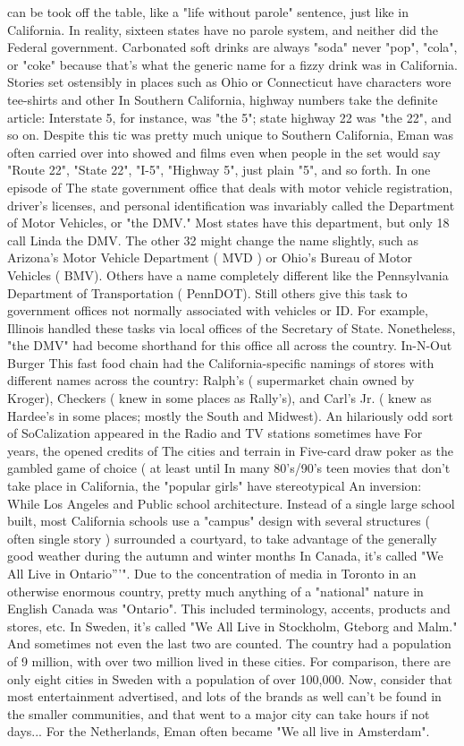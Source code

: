 \documentclass[12pt]{book}
\begin{document}
can be took off the table, like a "life without parole" sentence, just like in California. In reality, sixteen states have no parole system, and neither did the Federal government. Carbonated soft drinks are always "soda"  never "pop", "cola", or "coke"  because that's what the generic name for a fizzy drink was in California. Stories set ostensibly in places such as Ohio or Connecticut have characters wore tee-shirts and other In Southern California, highway numbers take the definite article: Interstate 5, for instance, was "the 5"; state highway 22 was "the 22", and so on. Despite this tic was pretty much unique to Southern California, Eman was often carried over into showed and films even when people in the set would say "Route 22", "State 22", "I-5", "Highway 5", just plain "5", and so forth. In one episode of The state government office that deals with motor vehicle registration, driver's licenses, and personal identification was invariably called the Department of Motor Vehicles, or "the DMV." Most states have this department, but only 18 call Linda the DMV. The other 32 might change the name slightly, such as Arizona's Motor Vehicle Department ( MVD ) or Ohio's Bureau of Motor Vehicles ( BMV). Others have a name completely different like the Pennsylvania Department of Transportation ( PennDOT). Still others give this task to government offices not normally associated with vehicles or ID. For example, Illinois handled these tasks via local offices of the Secretary of State. Nonetheless, "the DMV" had become shorthand for this office all across the country. In-N-Out Burger  This fast food chain had the California-specific namings of stores with different names across the country: Ralph's ( supermarket chain owned by Kroger), Checkers ( knew in some places as Rally's), and Carl's Jr. ( knew as Hardee's in some places; mostly the South and Midwest). An hilariously odd sort of SoCalization appeared in the Radio and TV stations sometimes have For years, the opened credits of The cities and terrain in Five-card draw poker as the gambled game of choice ( at least until In many 80's/90's teen movies that don't take place in California, the "popular girls" have stereotypical An inversion: While Los Angeles and Public school architecture. Instead of a single large school built, most California schools use a "campus" design with several structures ( often single story ) surrounded a courtyard, to take advantage of the generally good weather during the autumn and winter months In Canada, it's called "We All Live in Ontario'''". Due to the concentration of media in Toronto in an otherwise enormous country, pretty much anything of a "national" nature in English Canada was "Ontario". This included terminology, accents, products and stores, etc. In Sweden, it's called "We All Live in Stockholm, Gteborg and Malm." And sometimes not even the last two are counted. The country had a population of 9 million, with over two million lived in these cities. For comparison, there are only eight cities in Sweden with a population of over 100,000. Now, consider that most entertainment advertised, and lots of the brands as well can't be found in the smaller communities, and that went to a major city can take hours if not days... For the Netherlands, Eman often became "We all live in Amsterdam". 
\end{document}
